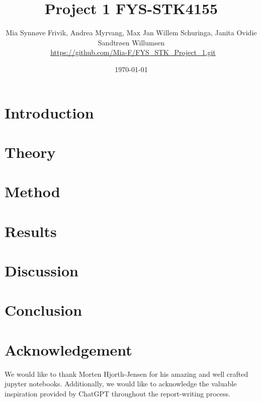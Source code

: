 \documentclass[reprint,english,notitlepage]{revtex4-1}  %
\begin{document}
\title{Project 1 FYS-STK4155}   %
\author{Mia Synnøve Frivik, Andrea Myrvang, Max Jan Willem Schuringa, Janita Ovidie Sandtrøen Willumsen \\ \faGithub \, \url{https://github.com/Mia-F/FYS_STK_Project_1.git}}        
\date{\today}                             %
\noaffiliation   

\begin{abstract}                          %



\end{abstract}                            %
\maketitle                                %


\section{Introduction}


\section{Theory}   %


\section{Method}



\section{Results}

\section{Discussion}

\section{Conclusion}

\section{Acknowledgement}
\noindent We would like to thank Morten Hjorth-Jensen for his amazing and well crafted jupyter notebooks. Additionally, we would like to acknowledge the valuable 
inspiration provided by ChatGPT throughout the report-writing process.
\end{document}
